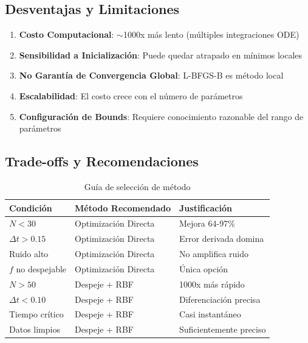 \documentclass[11pt,a4paper]{article}
\begin{document}
\subsection{Desventajas y Limitaciones}

\begin{enumerate}
    \item \textbf{Costo Computacional}: $\sim$1000x más lento (múltiples integraciones ODE)

    \item \textbf{Sensibilidad a Inicialización}: Puede quedar atrapado en mínimos locales

    \item \textbf{No Garantía de Convergencia Global}: L-BFGS-B es método local

    \item \textbf{Escalabilidad}: El costo crece con el número de parámetros

    \item \textbf{Configuración de Bounds}: Requiere conocimiento razonable del rango de parámetros
\end{enumerate}

\subsection{Trade-offs y Recomendaciones}

\begin{table}[H]
\centering
\caption{Guía de selección de método}
\label{tab:method_selection}
\begin{tabular}{@{}lll@{}}
\toprule
\textbf{Condición} & \textbf{Método Recomendado} & \textbf{Justificación} \\
\midrule
$N < 30$ & Optimización Directa & Mejora 64-97\% \\
$\Delta t > 0.15$ & Optimización Directa & Error derivada domina \\
Ruido alto & Optimización Directa & No amplifica ruido \\
$f$ no despejable & Optimización Directa & Única opción \\
\midrule
$N > 50$ & Despeje + RBF & 1000x más rápido \\
$\Delta t < 0.10$ & Despeje + RBF & Diferenciación precisa \\
Tiempo crítico & Despeje + RBF & Casi instantáneo \\
Datos limpios & Despeje + RBF & Suficientemente preciso \\
\bottomrule
\end{tabular}
\end{table}
\end{document}
